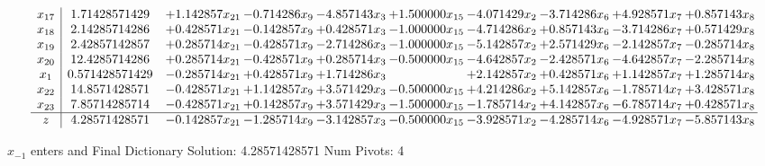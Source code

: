 \documentclass[10pt]{article}
\begin{document}
\[\begin{array}{c| c c@{\hskip 2pt} c@{\hskip 2pt} c@{\hskip 2pt} c@{\hskip 2pt} c@{\hskip 2pt} c@{\hskip 2pt} c@{\hskip 2pt} c@{\hskip 2pt} }
 x_{17}   &  1.71428571429 & + 1.142857 x_{21} & -0.714286 x_{9} & -4.857143 x_{3} & + 1.500000 x_{15} & -4.071429 x_{2} & -3.714286 x_{6} & + 4.928571 x_{7} & + 0.857143 x_{8}\\
 x_{18}   &  2.14285714286 & + 0.428571 x_{21} & -0.142857 x_{9} & + 0.428571 x_{3} & -1.000000 x_{15} & -4.714286 x_{2} & + 0.857143 x_{6} & -3.714286 x_{7} & + 0.571429 x_{8}\\
 x_{19}   &  2.42857142857 & + 0.285714 x_{21} & -0.428571 x_{9} & -2.714286 x_{3} & -1.000000 x_{15} & -5.142857 x_{2} & + 2.571429 x_{6} & -2.142857 x_{7} & -0.285714 x_{8}\\
 x_{20}   &  12.4285714286 & + 0.285714 x_{21} & -0.428571 x_{9} & + 0.285714 x_{3} & -0.500000 x_{15} & -4.642857 x_{2} & -2.428571 x_{6} & -4.642857 x_{7} & -2.285714 x_{8}\\
 x_{1}   &  0.571428571429 & -0.285714 x_{21} & + 0.428571 x_{9} & + 1.714286 x_{3} &   & + 2.142857 x_{2} & + 0.428571 x_{6} & + 1.142857 x_{7} & + 1.285714 x_{8}\\
 x_{22}   &  14.8571428571 & -0.428571 x_{21} & + 1.142857 x_{9} & + 3.571429 x_{3} & -0.500000 x_{15} & + 4.214286 x_{2} & + 5.142857 x_{6} & -1.785714 x_{7} & + 3.428571 x_{8}\\
 x_{23}   &  7.85714285714 & -0.428571 x_{21} & + 0.142857 x_{9} & + 3.571429 x_{3} & -1.500000 x_{15} & -1.785714 x_{2} & + 4.142857 x_{6} & -6.785714 x_{7} & + 0.428571 x_{8}\\
\hline
z    &  4.28571428571 & -0.142857 x_{21} & -1.285714 x_{9} & -3.142857 x_{3} & -0.500000 x_{15} & -3.928571 x_{2} & -4.285714 x_{6} & -4.928571 x_{7} & -5.857143 x_{8}\\
\end{array}\]


 $ x_{-1} $ enters and Final Dictionary
Solution:  4.28571428571
Num Pivots:  4
\end{document}
